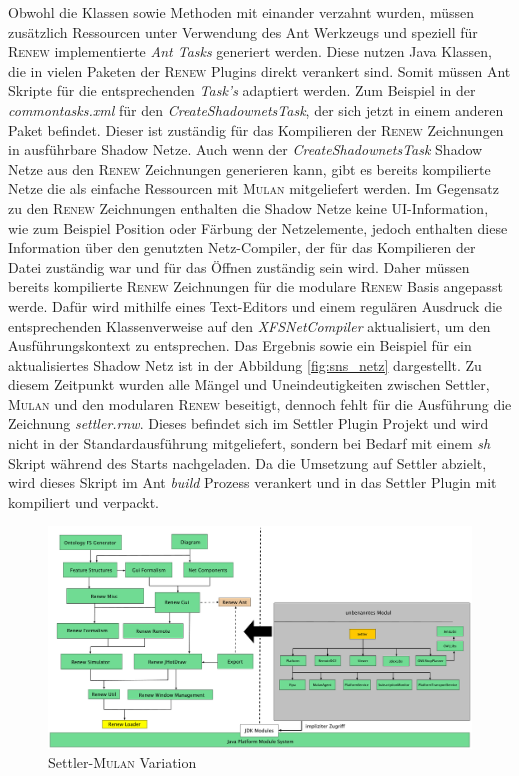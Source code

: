 	Obwohl die Klassen sowie Methoden mit einander verzahnt wurden, müssen zusätzlich Ressourcen unter Verwendung des Ant Werkzeugs und speziell für \textsc{Renew} implementierte \textit{Ant Tasks} generiert werden. Diese nutzen Java Klassen, die in vielen Paketen der \textsc{Renew} Plugins direkt verankert sind. Somit müssen Ant Skripte für die entsprechenden \textit{Task's} adaptiert werden. Zum Beispiel in der \textit{commontasks.xml} für den \textit{CreateShadownetsTask}, der sich jetzt in einem anderen Paket befindet. Dieser ist zuständig für das Kompilieren der \textsc{Renew} Zeichnungen in ausführbare Shadow Netze. Auch wenn der \textit{CreateShadownetsTask} Shadow Netze aus den \textsc{Renew} Zeichnungen generieren kann, gibt es bereits kompilierte Netze die als einfache Ressourcen mit \textsc{Mulan} mitgeliefert werden. \newline
	Im Gegensatz zu den \textsc{Renew} Zeichnungen enthalten die Shadow Netze keine UI-Information, wie zum Beispiel Position oder Färbung der Netzelemente, jedoch enthalten diese Information über den genutzten Netz-Compiler, der für das Kompilieren der Datei zuständig war und für das Öffnen zuständig sein wird. Daher müssen bereits kompilierte \textsc{Renew} Zeichnungen für die modulare \textsc{Renew} Basis angepasst werde. Dafür wird mithilfe eines Text-Editors und einem regulären Ausdruck die entsprechenden Klassenverweise auf den \textit{XFSNetCompiler} aktualisiert, um den Ausführungskontext zu entsprechen. \newline
	Das Ergebnis sowie ein Beispiel für ein aktualisiertes Shadow Netz ist in der Abbildung \ref{fig:sns_netz} dargestellt. \bigbreak
	Zu diesem Zeitpunkt wurden alle Mängel und Uneindeutigkeiten zwischen Settler, \textsc{Mulan} und den modularen \textsc{Renew} beseitigt, dennoch fehlt für die Ausführung die Zeichnung \textit{settler.rnw}. Dieses befindet sich im Settler Plugin Projekt und wird nicht in der Standardausführung mitgeliefert, sondern bei Bedarf mit einem \textit{sh} Skript während des Starts nachgeladen. \newline
	Da die Umsetzung auf Settler abzielt, wird dieses Skript im Ant \textit{build} Prozess verankert und in das Settler Plugin mit kompiliert und verpackt. \newline

	\begin{figure}[h!]
	  \centering
	  \includegraphics[width=\textwidth]{material/images/settler-renew-mulan-vm.pdf}
	  \caption{Settler-\textsc{Mulan} Variation}
	  \label{fig:mul_prot}
	\end{figure}

